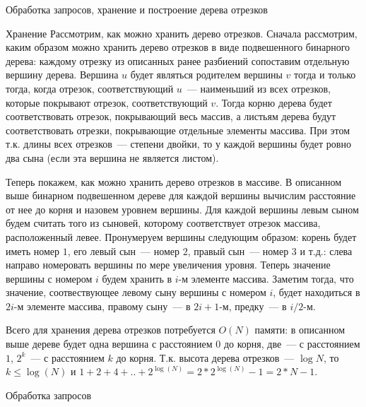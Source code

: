 ﻿\begin{section}{Обработка запросов, хранение и построение дерева отрезков}

\begin{subsection}[Хранение]{Хранение}
Рассмотрим, как можно хранить дерево отрезков. Сначала рассмотрим, каким образом
можно хранить дерево отрезков в виде подвешенного бинарного дерева: каждому отрезку из описанных ранее
разбиений сопоставим отдельную вершину дерева. Вершина $u$ будет являться
родителем вершины $v$ тогда и только тогда, когда отрезок, соответствующий $u$~--- наименьший
из всех отрезков, которые покрывают отрезок, соответствующий $v$. Тогда корню дерева
будет соответствовать отрезок, покрывающий весь массив, а листьям дерева будут соответствовать
отрезки, покрывающие отдельные элементы массива. При этом т.к. длины всех отрезков~--- степени 
двойки, то у каждой вершины будет ровно два сына (если эта вершина не является листом).

Теперь покажем, как можно хранить дерево отрезков в массиве. В описанном выше бинарном подвешенном 
дереве для каждой вершины вычислим расстояние от нее до корня и назовем уровнем вершины. 
Для каждой вершины левым сыном будем считать того из сыновей, которому соответствует отрезок массива, 
расположенный левее. Пронумеруем вершины следующим образом: корень будет иметь номер $1$, его 
левый сын~--- номер $2$, правый сын~--- номер $3$ и т.д.: слева направо номеровать вершины по мере 
увеличения уровня. Теперь значение вершины с номером $i$ будем хранить в $i$-м элементе массива. 
Заметим тогда, что значение, соотвествующее левому сыну вершины с номером $i$, будет находиться 
в $2i$-м элементе массива, правому сыну~--- в $2i + 1$-м, предку~--- в $i / 2$-м.

Всего для хранения дерева отрезков потребуется $O(N)$ памяти: в описанном выше дереве будет
одна вершина с расстоянием $0$ до корня, две~--- с расстоянием $1$, $2^k$~--- с расстоянием
$k$ до корня. Т.к. высота дерева отрезков~--- $\log N$, то $k \le \log(N)$ и 
$1 + 2 + 4 + .. + 2^{\log(N)} = 2 * 2^{\log(N)} - 1 = 2 * N - 1$.

\end{subsection}

\begin{subsection}{Обработка запросов}


\end{subsection}
\end{section}
